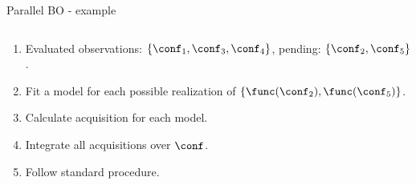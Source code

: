 \begin{frame}[c]{Parallel BO - example}

\begin{columns}[T] %
\begin{column}{.48\textwidth}
    \begin{enumerate}
        \item<1-5> Evaluated observations: $\left \{\conf_1, \conf_3, \conf_4 \right \}$, pending: $\left \{\conf_2, \conf_5 \right \}$. %
        \item<2-5> Fit a model for each possible realization of $\left \{\func(\conf_2), \func(\conf_5) \right \}$. %
        \item<3-5> Calculate acquisition for each model. %
        \item<4-5> Integrate all acquisitions over $\conf$. %
        \item<5-5> Follow standard procedure. 
    \end{enumerate}


\end{column}
\end{columns}
\end{frame}
